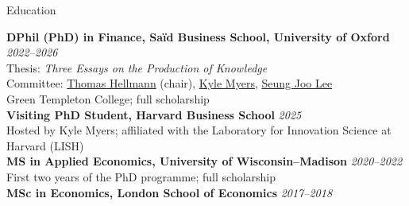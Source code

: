 \documentclass{resume} %
\begin{document}

\begin{rSection}{Education}

{\bf DPhil (PhD) in Finance, Sa\"{i}d Business School, University of Oxford} \hfill {\em 2022--2026} \\
Thesis: \textit{Three Essays on the Production of Knowledge} \\
Committee: \href{https://www.sbs.ox.ac.uk/about-us/people/thomas-hellmann}{Thomas Hellmann} (chair), \href{https://www.hbs.edu/faculty/Pages/profile.aspx?facId=951639}{Kyle Myers}, \href{https://www.sbs.ox.ac.uk/about-us/people/seung-joo-lee}{Seung Joo Lee} \\
Green Templeton College; full scholarship \\
{\bf Visiting PhD Student, Harvard Business School} \hfill {\em 2025} \\
Hosted by Kyle Myers; affiliated with the Laboratory for Innovation Science at Harvard (LISH) \\
{\bf MS in Applied Economics, University of Wisconsin--Madison} \hfill {\em 2020--2022} \\
First two years of the PhD programme; full scholarship \\
{\bf MSc in Economics, London School of Economics} \hfill {\em 2017--2018}

\end{rSection}



\end{document}
